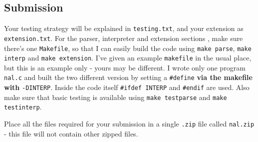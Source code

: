 \begin{exercise}
\subsection*{Submission}

Your testing strategy will be explained in \verb^testing.txt^, and
your extension as \verb^extension.txt^. For the parser, interpreter
and extension sections , make sure there's one \verb^Makefile^, so that I
can easily build the code using \verb^make parse^, \verb^make interp^
and \verb^make extension^. I've given an example \verb^makefile^ in the
usual place, but this is an example only - yours may be different.
I wrote only one program \verb^nal.c^ and built the two
different version by setting a \verb^#define^ {\bf via the makefile with}
\verb^-DINTERP^. Inside the code itself \verb^#ifdef INTERP^ and \verb^#endif^ are used.
Also make sure that basic testing is available using \verb^make testparse^ and \verb^make testinterp^.

\noindent Place all the files required for your submission in a single \verb^.zip^ file called \verb^nal.zip^ - this file will not contain other zipped files.

\end{exercise}




